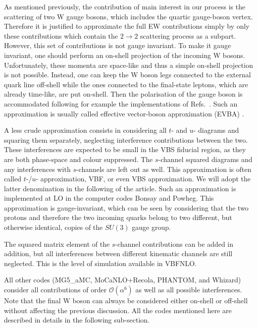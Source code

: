 As mentioned previously, the contribution of main interest in our process is
the scattering of two W gauge bosons, which includes the quartic gauge-boson vertex.
Therefore it is justified to approximate the full EW contributions simply by only these contributions which contain the $2\rightarrow 2$ scattering process as a subpart.
However, this set of contributions is not gauge invariant.
To make it gauge invariant, one should perform an on-shell projection of the incoming W bosons.
Unfortunately, these momenta are space-like and thus a simple on-shell projection is not possible.
Instead, one can keep the W boson legs connected to the external quark line off-shell while the ones connected to the final-state leptons, which are already time-like, are put on-shell.
Then the polarisation of the gauge boson is accommodated following for example the implementations of Refs.~\cite{Kuss:1995yv,Accomando:2006hq}.
Such an approximation is usually called effective vector-boson approximation (EVBA) \cite{Dawson:1984gx,Duncan:1985vj,Cahn:1983ip}.

A less crude approximation consists in considering all $t$- and $u$- diagrams and squaring them separately, neglecting interference contributions between the two.
These interferences are expected to be small in the VBS fiducial region, as they are both phase-space and colour suppressed.
The $s$-channel squared diagrams and any interferences with $s$-channels are left out as well.
This approximation is often called $t$-/$u$- approximation, VBF, or even VBS approximation.
We will adopt the latter denomination in the following of the article.
Such an approximation is implemented at LO in the computer codes {\sc Bonsay} and {\sc Powheg}.
This approximation is gauge-invariant, which can be seen by considering that the two protons and therefore the two incoming quarks belong to two different, but otherwise identical, copies of the $SU \left(3\right)$ gauge group.

The squared matrix element of the $s$-channel contributions can be added in addition, but all interferences between different kinematic channels are still neglected.
This is the level of simulation available in {\sc VBFNLO}.

All other codes ({\sc MG5\_aMC}, {\sc MoCaNLO+Recola}, {\sc PHANTOM}, and {\sc Whizard}) consider all contributions of order $\mathcal{O}{\left(\alpha^{6}\right)}$ as well as all possible interferences.
Note that the final W boson can always be considered either on-shell or off-shell without affecting the previous discussion.
All the codes mentioned here are described in details in the following sub-section.

